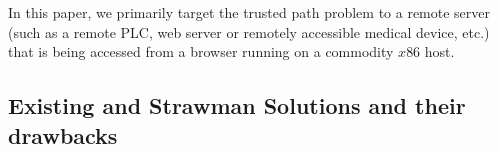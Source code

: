 


In this paper, we primarily target the trusted path problem to a remote server (such as a remote PLC, web server or remotely accessible medical device, etc.) that is being accessed from a browser running on a commodity $x86$ host.


\subsection{ Existing and Strawman Solutions and their drawbacks}
\label{sec:problemStatement:existingSolution}




